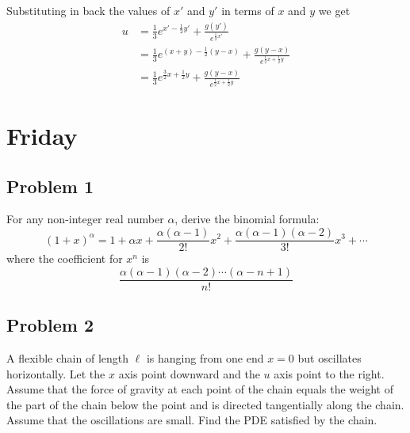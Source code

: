 \documentclass{ben}
\begin{document}
Substituting in back the values of $x'$ and $y'$ in terms of $x$ and $y$ we get
\begin{align*}
    u &= \frac{1}{3} e^{x' - \frac{1}{2}y'} + \frac{g(y')}{e^{\frac{1}{2}x'}}\\
    &= \frac{1}{3} e^{(x + y) - \frac{1}{2}(y - x)} + \frac{g(y - x)}{e^{\frac{1}{2}x + \frac{1}{2}y}}\\
    &= \frac{1}{3} e^{\frac{3}{2}x + \frac{1}{2}y} + \frac{g(y - x)}{e^{\frac{1}{2}x + \frac{1}{2}y}}
\end{align*}
\section{Friday}
\subsection{Problem 1}
\noindent
For any non-integer real number $\alpha$, derive the binomial formula:
\[
(1 + x)^\alpha = 1 + \alpha x + \frac{\alpha(\alpha - 1)}{2!} x^2
+ \frac{\alpha (\alpha - 1)(\alpha - 2)}{3!}x^3 + \cdots
\]
where the coefficient for $x^n$ is
\[
\frac{\alpha (\alpha - 1) (\alpha - 2) \cdots (\alpha - n + 1)}{n!}
\]
\subsection{Problem 2}
\noindent
A flexible chain of length $\ell$ is hanging from one end $x = 0$ but oscillates
horizontally. Let the $x$ axis point downward and the $u$ axis point to the right.
Assume that the force of gravity at each point of the chain equals the weight
of the part of the chain below the point and is directed tangentially along the
chain. Assume that the oscillations are small. Find the PDE satisfied by the
chain.
\end{document}
